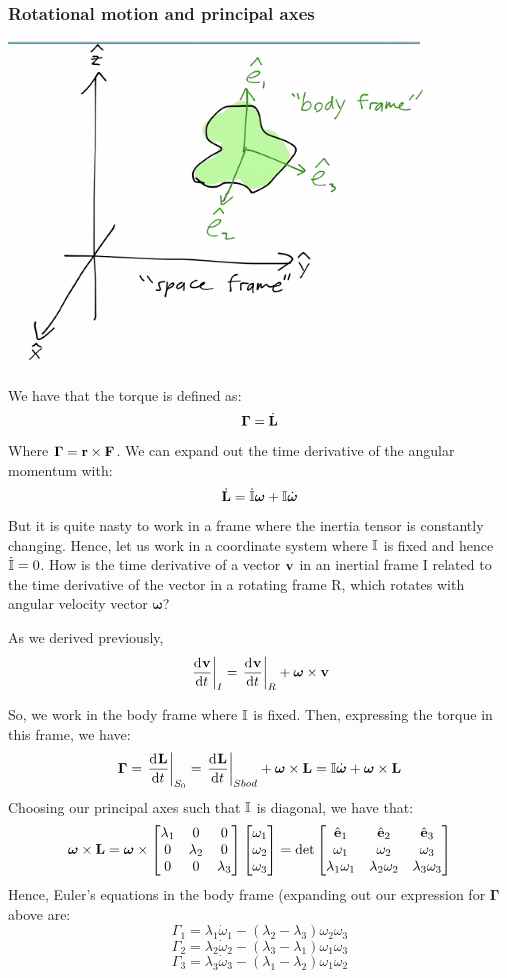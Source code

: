 \documentclass[../PHYS306Notes.tex]{subfiles}
\begin{document}
\subsubsection{Rotational motion and principal axes}
\begin{center}
    \includegraphics[scale=1]{Lecture-19/l19-img1.png}
\end{center}
We have that the torque is defined as:
\[\bm{\Gamma} = \dot{\mathbf{L}}\]
Where $\bm{\Gamma} = \mathbf{r} \times \mathbf{F}$. We can expand out the time derivative of the angular momentum with:
\[\dot{\mathbf{L}} = \dot{\mathbb{I}}\bm{\omega} + \mathbb{I}\dot{\bm{\omega}}\]
But it is quite nasty to work in a frame where the inertia tensor is constantly changing. Hence, let us work in a coordinate system where $\mathbb{I}$ is fixed and hence $\dot{\mathbb{I}} = 0$. 
\newline How is the time derivative of a vector $\mathbf{v}$ in an inertial frame I related to the time derivative of the vector in a rotating frame R, which rotates with angular velocity vector $\bm{\omega}$?
\begin{s}
As we derived previously,
\[\left.\dod{\v{v}}{t}\right|_I = \left.\dod{\v{v}}{t}\right|_R + \bm{\omega} \times \v{v}\]
\end{s}
So, we work in the body frame where $\mathbb{I}$ is fixed. Then, expressing the torque in this frame, we have:
\[\bm{\Gamma} = \left.\dod{\v{L}}{t}\right|_{S_0} = \left.\dod{\v{L}}{t}\right|_{Sbod} + \bm{\omega} \times \v{L} = \II\dot{\bm{\omega}} + \bm{\omega} \times \v{L}\]
Choosing our principal axes such that $\mathbb{I}$ is diagonal, we have that:
\[\bm{\omega} \times \mathbf{L} = \bm{\omega} \times \begin{bmatrix}\lambda_1 & 0 & 0 \\ 0 & \lambda_2 & 0 \\ 0 & 0 & \lambda_3\end{bmatrix}\begin{bmatrix}\omega_1 \\ \omega_2 \\ \omega_3\end{bmatrix} = \det\begin{bmatrix}\hat{\mathbf{e}}_1 & \hat{\mathbf{e}}_2 & \hat{\mathbf{e}}_3 \\ \omega_1 & \omega_2 & \omega_3 \\ \lambda_1\omega_1 & \lambda_2\omega_2 & \lambda_3\omega_3 \end{bmatrix}\]
Hence, Euler's equations in the body frame (expanding out our expression for $\bm{\Gamma}$ above are:
\[\Gamma_1 = \lambda_1\dot{\omega}_1 - (\lambda_2 - \lambda_3)\omega_2\omega_3\]
\[\Gamma_2 = \lambda_2\dot{\omega}_2 - (\lambda_3 - \lambda_1)\omega_1\omega_3\]
\[\Gamma_3 = \lambda_3\dot{\omega}_3 - (\lambda_1 - \lambda_2)\omega_1\omega_2\]
\end{document}
